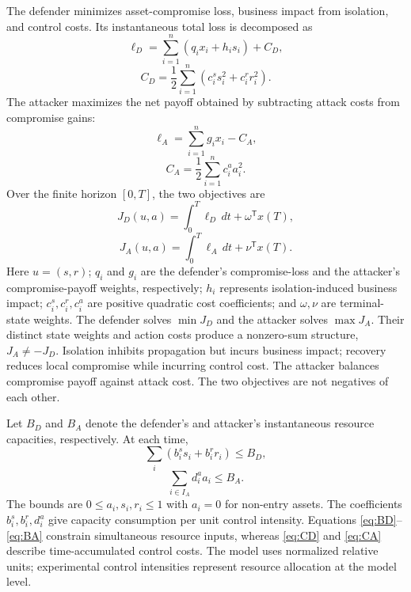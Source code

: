 \documentclass[conference,letterpaper]{IEEEtran}
\begin{document}
The defender minimizes asset-compromise loss, business impact from isolation, and control costs. Its instantaneous total loss is decomposed as
\begin{equation}\label{eq:ellD}
\ell_D=\sum_{i=1}^n(q_i x_i+h_i s_i)+C_D,
\end{equation}
\begin{equation}\label{eq:CD}
C_D=\frac12\sum_{i=1}^n(c_i^s s_i^2+c_i^r r_i^2).
\end{equation}
The attacker maximizes the net payoff obtained by subtracting attack costs from compromise gains:
\begin{equation}\label{eq:ellA}
\ell_A=\sum_{i=1}^n g_i x_i-C_A,
\end{equation}
\begin{equation}\label{eq:CA}
C_A=\frac12\sum_{i=1}^n c_i^a a_i^2.
\end{equation}
Over the finite horizon $[0,T]$, the two objectives are
\begin{equation}\label{eq:JD}
J_D(u,a)=\int_0^T\ell_D\,dt+\omega^{\mathsf T}x(T),
\end{equation}
\begin{equation}\label{eq:JA}
J_A(u,a)=\int_0^T\ell_A\,dt+\nu^{\mathsf T}x(T).
\end{equation}
Here $u=(s,r)$; $q_i$ and $g_i$ are the defender's compromise-loss and the attacker's compromise-payoff weights, respectively; $h_i$ represents isolation-induced business impact; $c_i^s,c_i^r,c_i^a$ are positive quadratic cost coefficients; and $\omega,\nu$ are terminal-state weights. The defender solves $\min J_D$ and the attacker solves $\max J_A$. Their distinct state weights and action costs produce a nonzero-sum structure, $J_A\ne-J_D$. Isolation inhibits propagation but incurs business impact; recovery reduces local compromise while incurring control cost. The attacker balances compromise payoff against attack cost. The two objectives are not negatives of each other.

Let $B_D$ and $B_A$ denote the defender's and attacker's instantaneous resource capacities, respectively. At each time,
\begin{equation}\label{eq:BD}
\sum_i (b_i^s s_i+b_i^r r_i)\leq B_D,
\end{equation}
\begin{equation}\label{eq:BA}
\sum_{i\in I_A}d_i^a a_i\leq B_A.
\end{equation}
The bounds are $0\le a_i,s_i,r_i\le1$ with $a_i=0$ for non-entry assets. The coefficients $b_i^s,b_i^r,d_i^a$ give capacity consumption per unit control intensity. Equations \eqref{eq:BD}--\eqref{eq:BA} constrain simultaneous resource inputs, whereas \eqref{eq:CD} and \eqref{eq:CA} describe time-accumulated control costs. The model uses normalized relative units; experimental control intensities represent resource allocation at the model level.
\end{document}
